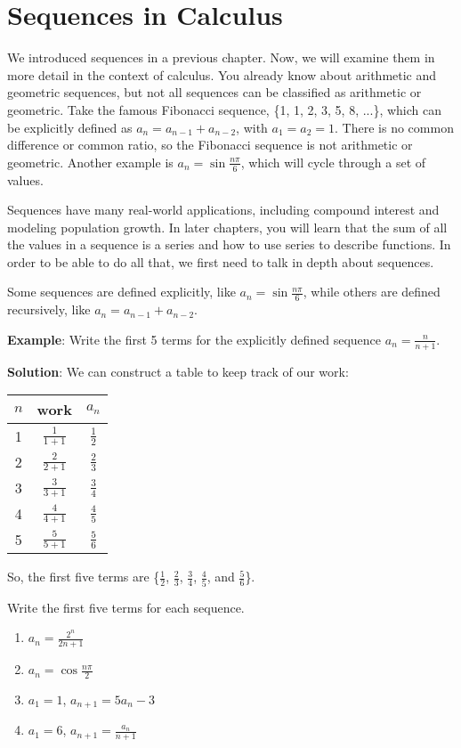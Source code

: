 \chapter{Sequences in Calculus}

We introduced sequences in a previous chapter. Now, we will examine them 
in more detail in the context of calculus. You already know about arithmetic and 
geometric sequences, but not all sequences can be classified as arithmetic or 
geometric. Take the famous Fibonacci sequence, \{1, 1, 2, 3, 5, 8, ...\}, 
which can be explicitly defined as $a_n = a_{n-1} + a_{n-2}$, with $a_1 = a_2 
= 1$. There is no common difference or common ratio, so the Fibonacci sequence 
is not arithmetic or geometric. Another example is $a_n = \sin{\frac{n\pi}{6}}$, 
which will cycle through a set of values. 

Sequences have many real-world applications, including compound interest and 
modeling population growth. In later chapters, you will learn that the sum of 
all the values in a sequence is a series and how to use series to describe 
functions. In order to be able to do all that, we first need to talk in depth 
about sequences. 

Some sequences are defined explicitly, like $a_n = \sin{\frac{n\pi}{6}}$, while 
others are defined recursively, like $a_n = a_{n-1} + a_{n-2}$. 

\textbf{Example}: Write the first 5 terms for the explicitly defined sequence $a_n = 
\frac{n}{n+1}$.

\textbf{Solution}: We can construct a table to keep track of our work:
\begin{center}
\begin{tabular}{|c|c|c|}\hline
$n$ & work & $a_n$\\
\hline
1 & $\frac{1}{1+1}$ & $\frac{1}{2}$\\
\hline
2 & $\frac{2}{2+1}$ & $\frac{2}{3}$\\
\hline
3 & $\frac{3}{3+1}$ & $\frac{3}{4}$\\
\hline
4 & $\frac{4}{4+1}$ & $\frac{4}{5}$\\
\hline
5 & $\frac{5}{5+1}$ & $\frac{5}{6}$\\
\hline
\end{tabular}
\end{center}

So, the first five terms are \{$\frac{1}{2}$, $\frac{2}{3}$, $\frac{3}{4}$, 
$\frac{4}{5}$, and $\frac{5}{6}$\}. 

\begin{Exercise}[label = seqcalc1]
Write the first five terms for each sequence. 
\begin{enumerate}
\item $a_n = \frac{2^n}{2n+1}$
\item $a_n = \cos{\frac{n\pi}{2}}$
\item $a_1 = 1$, $a_{n+1} = 5a_n-3$
\item $a_1 = 6$, $a_{n+1} = \frac{a_n}{n+1}$
\end{enumerate}
\end{Exercise}

